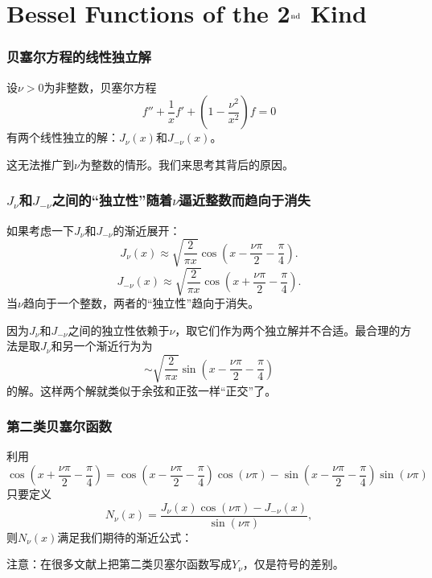 \documentclass[CJK]{beamer}
\begin{document}
\section{Bessel Functions of the 2$^{\rm nd}$ Kind}

\begin{frame}
\frametitle{贝塞尔方程的线性独立解}

设$\nu >0$为非整数，贝塞尔方程
$$f''+\frac{1}{x}f' + \left(1-\frac{\nu^2}{x^2}\right)f = 0$$
有两个线性独立的解：$J_\nu(x)$和$J_{-\nu}(x)$。

\skiplines

这无法推广到$\nu$为整数的情形。我们来思考其背后的原因。

\end{frame}

\begin{frame}
\frametitle{$J_\nu$和$J_{-\nu}$之间的“独立性”随着$\nu$逼近整数而趋向于消失}

如果考虑一下$J_\nu$和$J_{-\nu}$的渐近展开：
$$J_\nu(x) \approx \sqrt{\frac{2}{\pi x}}\cos{\left(x-\frac{\nu \pi}{2}-\frac{\pi}{4}\right)}.$$
$$J_{-\nu}(x) \approx \sqrt{\frac{2}{\pi x}}\cos{\left(x+\frac{\nu \pi}{2}-\frac{\pi}{4}\right)}.$$
当$\nu$趋向于一个整数，两者的“独立性”趋向于消失。

\skipline

因为$J_\nu$和$J_{-\nu}$之间的独立性依赖于$\nu$，取它们作为两个独立解并不合适。最合理的方法是取$J_\nu$和另一个渐近行为为
$$ \sim \sqrt{\frac{2}{\pi x}}\sin{\left(x-\frac{\nu \pi}{2}-\frac{\pi}{4}\right)}$$
的解。这样两个解就类似于余弦和正弦一样“正交”了。

\end{frame}

\begin{frame}
\frametitle{第二类贝塞尔函数}

利用
{\small
$$ \cos{\left(x+\frac{\nu \pi}{2}-\frac{\pi}{4}\right)} = \cos{\left(x-\frac{\nu \pi}{2}-\frac{\pi}{4}\right)}\cos{(\nu\pi)} -  \sin{\left(x-\frac{\nu \pi}{2}-\frac{\pi}{4}\right)}\sin{(\nu\pi)} $$}
只要定义
$$N_\nu(x) = \frac{J_\nu(x)\cos{(\nu\pi)} - J_{-\nu}(x)}{\sin{(\nu\pi)}},$$
则$N_\nu(x)$满足我们期待的渐近公式：

{\blue 注意：在很多文献上把第二类贝塞尔函数写成$Y_\nu$，仅是符号的差别。}
\end{frame}
\end{document}
